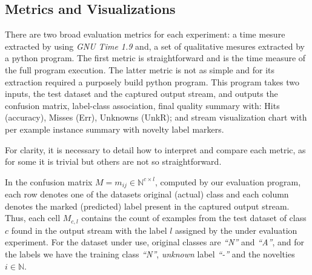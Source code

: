 




\subsection{Metrics and Visualizations}

There are two broad evaluation metrics for each experiment:
a time mesure extracted by using \emph{GNU Time 1.9} and,
a set of qualitative mesures extracted by a python program.
The first metric is straightforward and is the time measure of the full program execution.
The latter metric is not as simple and for its extraction required a
purposely build python program.
This program takes two inputs, the test dataset and the captured output stream,
and outputs the confusion matrix, label-class association,
final quality summary with: Hits (accuracy), Misses (Err), Unknowns (UnkR); and
stream visualization chart with per example instance summary with novelty label markers.

For clarity, it is necessary to detail how to interpret and compare each metric,
as for some it is trivial but others are not so straightforward.

In the confusion matrix $M = m_{ij} \in \mathbb{N} ^{c \times{} l}$,
computed by our evaluation program,
each row denotes one of the datasets original (actual) class
and each column denotes the marked (predicted) label present in the captured output stream.
Thus, each cell $M_{c, l}$ contains the count of examples from the test dataset of class $c$
found in the output stream with the label $l$ assigned by the under evaluation experiment.
For the dataset under use, original classes are \emph{``N''} and \emph{``A''}, and
for the labels we have the training class \emph{``N''}, \emph{unknown} label \emph{``-''} and
the novelties $i \in \mathbb{N}$.

